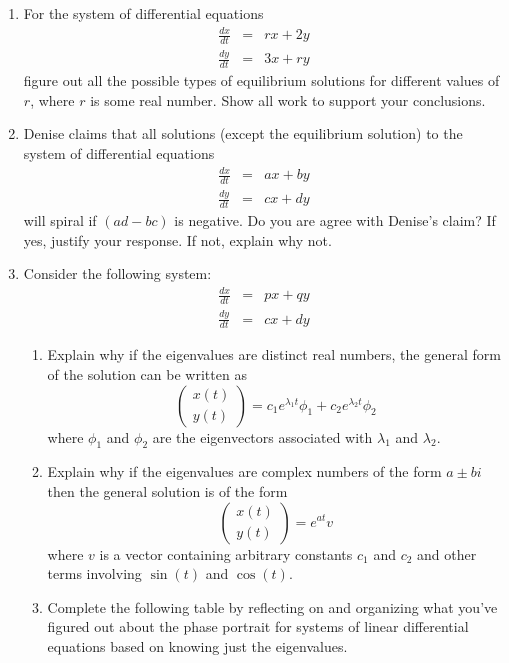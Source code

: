 \begin{enumerate}
\begin{enumerate*}[resume]
\end{enumerate*}


\item	For the system of differential equations   \label{12HWproblem5}
\[ \begin{matrix} \frac{dx}{dt}&=&rx+2y \\\frac{dy}{dt}&=& 3x+ry  \end{matrix}\] 
figure out all the possible types of equilibrium solutions for different values of $r$, where $r$ is some real number. Show all work to support your conclusions.


\item	Denise claims that all solutions (except the equilibrium solution) to the system of differential equations  
\[ \begin{matrix} \frac{dx}{dt}&=&ax+by \\\frac{dy}{dt}&=& cx+dy  \end{matrix}\]   will spiral if $(ad-bc)$ is negative. Do you are agree with Denise's claim? If yes, justify your response. If not, explain why not. \label{12HWproblem6}

\item \label{12HWproblem7}
Consider the following system:
\[ \begin{matrix} \frac{dx}{dt}&=&px+qy \\\frac{dy}{dt}&=& cx+dy  \end{matrix}\]
\begin{enumerate}
\item Explain why if the eigenvalues are distinct real numbers, the general form of the solution can be written as
\[
\begin{pmatrix}x(t)\\y(t)\end{pmatrix}=c_1e^{\lambda_1t}\phi_1+c_2 e^{\lambda_2t}\phi_2
\]
where $\phi_1$ and $\phi_2$ are the eigenvectors associated with $\lambda_1$ and $\lambda_2$. \label{12HWproblem7parta}
\item Explain why if the eigenvalues are complex numbers of the form $a \pm bi$ then the general solution is of the form
\[
\begin{pmatrix}x(t)\\y(t)\end{pmatrix}=e^{at}v
\]
where $v$ is a vector containing arbitrary constants $c_1$ and $c_2$ and other terms involving $\sin(t)$ and $\cos(t)$. \label{12HWproblem7partb}
\item Complete the following table by reflecting on and organizing what you've figured out about the phase portrait for systems of linear differential equations based on knowing just the eigenvalues. \label{12HWproblem7partc}
\end{enumerate}


\end{enumerate}
